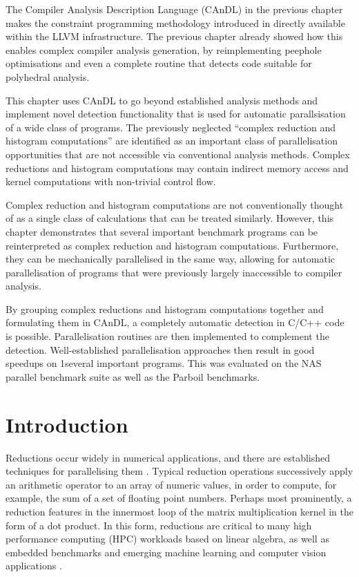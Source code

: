
    The Compiler Analysis Description Language (CAnDL) in the previous chapter
    makes the constraint programming methodology introduced in
    directly available within the LLVM infrastructure.
    The previous chapter already showed how this enables complex compiler
    analysis generation, by reimplementing peephole optimisations and even a
    complete routine that detects code suitable for polyhedral analysis.

    This chapter uses CAnDL to go beyond established analysis methods and
    implement novel detection functionality that is used for automatic
    parallsisation of a wide class of programs.
    The previously neglected ``complex reduction and histogram computations''
    are identified as an important class of parallelisation opportunities that
    are not accessible via conventional analysis methods.
    Complex reductions and histogram computations may contain indirect memory
    access and kernel computations with non-trivial control flow.

    Complex reduction and histogram computations are not conventionally thought
    of as a single class of calculations that can be treated similarly.
    However, this chapter demonstrates that several important benchmark programs
    can be reinterpreted as complex reduction and histogram computations.
    Furthermore, they can be mechanically parallelised in the same way, allowing
    for automatic parallelisation of programs that were previously largely
    inaccessible to compiler analysis.

    By grouping complex reductions and histogram computations together and
    formulating them in CAnDL, a completely automatic detection in C/C++ code is
    possible.
    Parallelisation routines are then implemented to complement the detection.
    Well-established parallelisation approaches then result in good speedups on
    1several important programs.
    This was evaluated on the NAS parallel benchmark suite as well as the
    Parboil benchmarks.

\section{Introduction}

    Reductions occur widely in numerical applications, and there are established
    techniques for parallelising them \citep{Jradi2017fast}.
    Typical reduction operations successively apply an arithmetic operator to an
    array of numeric values, in order to compute, for example, the sum of a set
    of floating point numbers.
    Perhaps most prominently, a reduction features in the innermost loop of the
    matrix multiplication kernel in the form of a dot product.
    In this form, reductions are critical to many high performance computing
    (HPC) workloads based on linear algebra, as well as embedded benchmarks and
    emerging machine learning and computer vision applications
    \citep{Reddy2016Reduction}.

